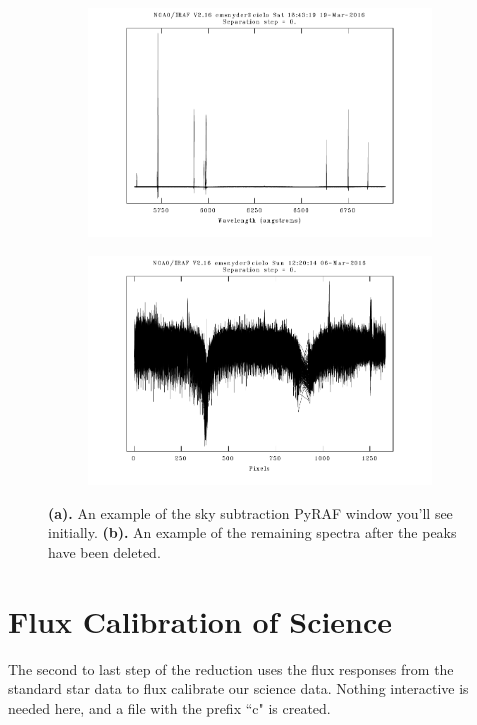 \documentclass[12pt]{report}
\begin{document}
\begin{figure}[t]
\centering
\begin{subfigure}[t]{0.49\textwidth}
\includegraphics[width=\textwidth]{skysub_before}
\end{subfigure}
\hfill
\begin{subfigure}[t]{0.49\textwidth}
\includegraphics[width=\textwidth]{skysub_good_example}
\end{subfigure}
\caption[Examples of sky subtraction]{\textbf{(a).} An example of the sky subtraction PyRAF window you'll see initially. \textbf{(b).} An example of the remaining spectra after the peaks have been deleted.}
\label{fig:skysub}
\end{figure}

\section{Flux Calibration of Science}
The second to last step of the reduction uses the flux responses from the standard star data to flux calibrate our science data. Nothing interactive is needed here, and a file with the prefix ``c" is created.
\end{document}
